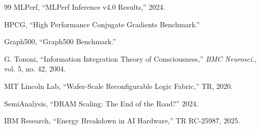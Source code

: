 ﻿\documentclass[review,3p,twocolumn]{elsarticle}
\begin{document}
\begin{thebibliography}{99}
 MLPerf, ``MLPerf Inference v4.0 Results,'' 2024.

 HPCG, ``High Performance Conjugate Gradients Benchmark.''

 Graph500, ``Graph500 Benchmark.''

 G. Tononi, ``Information Integration Theory of Consciousness,'' \emph{BMC Neurosci.}, vol. 5, no. 42, 2004.

 MIT Lincoln Lab, ``Wafer-Scale Reconfigurable Logic Fabric,'' TR, 2020.

 SemiAnalysis, ``DRAM Scaling: The End of the Road?'' 2024.

 IBM Research, ``Energy Breakdown in AI Hardware,'' TR RC-25987, 2025.

\end{thebibliography}
\end{document}
